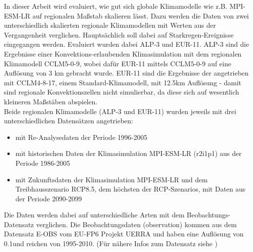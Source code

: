 In dieser Arbeit wird evaluiert, wie gut sich globale Klimamodelle wie z.B. MPI-ESM-LR auf regionalen Maßstab skalieren lässt. Dazu werden die Daten von zwei unterschiedlich skalierten regionale Klimamodellen mit Werten aus der Vergangenheit verglichen. Hauptsächlich soll dabei auf Starkregen-Ereignisse eingegangen werden. Evaluiert wurden dabei ALP-3 und EUR-11. ALP-3 sind  die Ergebnisse einer Konvektions-erlaubenden Klimasimulation mit dem regionalen Klimamodell CCLM5-0-9, wobei dafür EUR-11 mittels CCLM5-0-9 auf eine Auflösung von 3 km gebracht wurde. EUR-11 sind die Ergebnisse der angetrieben mit CCLM4-8-17, einem Standard-Klimamodell, mit 12.5km Auflösung - damit sind regionale Konvektionszellen nicht simulierbar, da diese sich auf wesentlich kleineren Maßstäben abspielen.\\
Beide regionalen Klimamodelle (ALP-3 und EUR-11) wurden jeweils mit drei unterschiedlichen Datensätzen angetrieben: 
\begin{itemize}
	\item mit Re-Analysedaten der Periode 1996-2005
	\item mit historischen Daten der Klimasimulation MPI-ESM-LR (r2i1p1) aus der Periode 1986-2005
	\item mit Zukunftsdaten der Klimasimulation MPI-ESM-LR und dem Treibhausszenario RCP8.5, dem höchsten der RCP-Szenarios, mit Daten aus der Periode 2090-2099
\end{itemize}
Die Daten werden dabei auf unterschiedliche Arten mit dem Beobachtungs-Datensatz verglichen. Die Beobachtungsdaten (observation) kommen aus dem Datensatz  E-OBS vom EU-FP6 Projekt UERRA und haben eine Auflösung von 0.1\degree und reichen von 1995-2010. (Für nähere Infos zum Datensatz siehe \cite{eobs})
